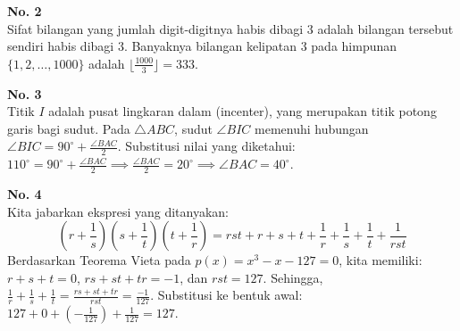 \documentclass[11pt, a4paper]{article}
\begin{document}
\begin{center}
\end{center}

\textbf{No. 2}\\
Sifat bilangan yang jumlah digit-digitnya habis dibagi 3 adalah bilangan tersebut sendiri habis dibagi 3.
Banyaknya bilangan kelipatan 3 pada himpunan $\{1, 2, \dots, 1000\}$ adalah $\lfloor \frac{1000}{3} \rfloor = 333$.

\textbf{No. 3}\\
Titik $I$ adalah pusat lingkaran dalam (incenter), yang merupakan titik potong garis bagi sudut. Pada $\triangle ABC$, sudut $\angle BIC$ memenuhi hubungan $\angle BIC = 90^\circ + \frac{\angle BAC}{2}$.
Substitusi nilai yang diketahui: $110^\circ = 90^\circ + \frac{\angle BAC}{2} \implies \frac{\angle BAC}{2} = 20^\circ \implies \angle BAC = 40^\circ$.

\begin{center}
\end{center}

\textbf{No. 4}\\
Kita jabarkan ekspresi yang ditanyakan:
\[ \left(r + \frac{1}{s}\right) \left(s + \frac{1}{t}\right) \left(t + \frac{1}{r}\right) = rst + r + s + t + \frac{1}{r} + \frac{1}{s} + \frac{1}{t} + \frac{1}{rst} \]
Berdasarkan Teorema Vieta pada $p(x) = x^3 - x - 127 = 0$, kita memiliki:
$r+s+t = 0$, $rs+st+tr = -1$, dan $rst = 127$.
Sehingga, $\frac{1}{r} + \frac{1}{s} + \frac{1}{t} = \frac{rs+st+tr}{rst} = \frac{-1}{127}$.
Substitusi ke bentuk awal:
$127 + 0 + \left(-\frac{1}{127}\right) + \frac{1}{127} = 127$.
\end{document}
